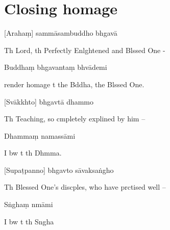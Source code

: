 \chapter[Closing homage]{Closing homage}

[Arahaṃ] sammāsambuddho bhgavā

\begin{english}
  Th Lord, th Perfectly Enlghtened and Blssed One -
\end{english}

Buddhaṃ bhgavantaṃ bhvādemi

\begin{english}
   render homage t the Bddha, the Blssed One.
\end{english}

[Svākkhto] bhgavtā dhammo

\begin{english}
  Th Teaching, so cmpletely explined by him --
\end{english}

Dhammaṃ namassāmi

\begin{english}
  I bw t th Dhmma.
\end{english}


[Supaṭpanno] bhgavto sāvaksaṅgho

\begin{english}
  Th Blessed One's discples, who have prctised well --
\end{english}

Sṅghaṃ nmāmi

\begin{english}
  I bw t th Sngha
\end{english}

